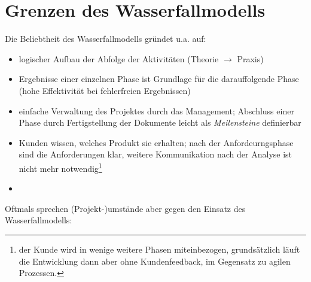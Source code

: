 \section{Grenzen des Wasserfallmodells}

\noindent
Die Beliebtheit des Wasserfallmodells gründet u.a. auf:

\begin{itemize}
    \item logischer Aufbau der Abfolge der Aktivitäten (Theorie $\rightarrow$ Praxis)
    \item Ergebnisse einer einzelnen Phase ist Grundlage für die darauffolgende Phase (hohe Effektivität bei fehlerfreien Ergebnissen)
    \item einfache Verwaltung des Projektes durch das Management; Abschluss einer Phase durch Fertigstellung der Dokumente leicht als \textit{Meilensteine} definierbar
    \item Kunden wissen, welches Produkt sie erhalten; nach der Anfordeurngsphase sind die Anforderungen klar, weitere Kommunikation nach der Analyse ist nicht mehr notwendig\footnote{
    der Kunde wird in wenige weitere Phasen miteinbezogen, grundsätzlich läuft die Entwicklung dann aber ohne Kundenfeedback, im Gegensatz zu agilen Prozessen.
    }
    \item
\end{itemize}

\noindent
Oftmals sprechen (Projekt-)umstände aber gegen den Einsatz des Wasserfallmodells:

